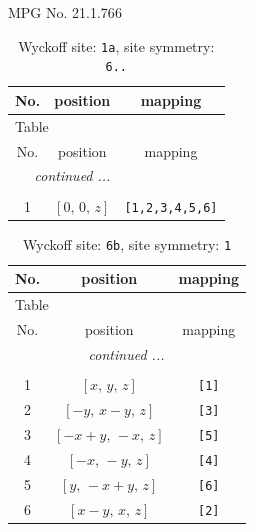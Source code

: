 \documentclass[fleqn,8pt]{jsarticle}
\begin{document}
\setcounter{MaxMatrixCols}{32}

\renewcommand{\tablename}{Table~}
\renewcommand{\figurename}{Figure~}
\begin{center}
\LARGE
MPG No. 21.1.76\quad$6$
\end{center}
\renewcommand{\arraystretch}{1.2}
\begin{longtable}{ccc}
\caption{Wyckoff site: {\tt 1a}, site symmetry: {\tt 6..}}
 \\
 \hline \hline
No. & position & mapping \\ \hline \endfirsthead

\multicolumn{2}{l}{\tablename\ \thetable{}} \\
 \hline \hline
No. & position & mapping \\ \hline \endhead

 \hline \hline
\multicolumn{2}{r}{\footnotesize\it continued ...} \\ \endfoot

 \hline \hline
\multicolumn{2}{r}{} \\ \endlastfoot

1 & $\left[ 0,\, 0,\, z \right]$ & {\tt [1,2,3,4,5,6]} \\
\end{longtable}
\renewcommand{\arraystretch}{1.2}
\begin{longtable}{ccc}
\caption{Wyckoff site: {\tt 6b}, site symmetry: {\tt 1}}
 \\
 \hline \hline
No. & position & mapping \\ \hline \endfirsthead

\multicolumn{2}{l}{\tablename\ \thetable{}} \\
 \hline \hline
No. & position & mapping \\ \hline \endhead

 \hline \hline
\multicolumn{2}{r}{\footnotesize\it continued ...} \\ \endfoot

 \hline \hline
\multicolumn{2}{r}{} \\ \endlastfoot

1 & $\left[ x,\, y,\, z \right]$ & {\tt [1]} \\ \hline
2 & $\left[ - y,\, x - y,\, z \right]$ & {\tt [3]} \\ \hline
3 & $\left[ - x + y,\, - x,\, z \right]$ & {\tt [5]} \\ \hline
4 & $\left[ - x,\, - y,\, z \right]$ & {\tt [4]} \\ \hline
5 & $\left[ y,\, - x + y,\, z \right]$ & {\tt [6]} \\ \hline
6 & $\left[ x - y,\, x,\, z \right]$ & {\tt [2]} \\
\end{longtable}
\end{document}
